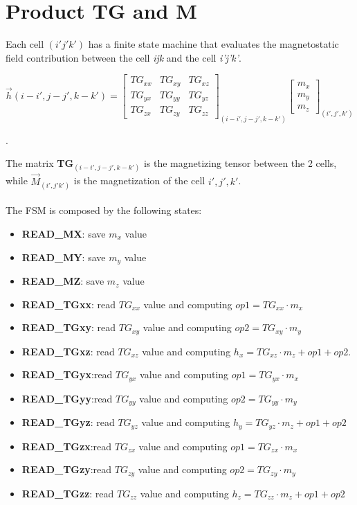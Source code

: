   \section{Product TG and M}
  Each cell $ (i'j'k') $ has a finite state machine that evaluates the magnetostatic field contribution between the cell \textit{ijk} and the cell \textit{i'j'k'}.
  \begin{center}
  		$ \overrightarrow{h}(i-i',j-j',k-k')= \begin{bmatrix}
  	TG_{xx} & TG_{xy} & TG_{xz}\\
  	TG_{yx} & TG_{yy}& TG_{yz}    	\\
  	TG_{zx}&TG_{zy} & TG_{zz}  
  	\end{bmatrix}_{(i-i',j-j',k-k')}\begin{bmatrix}
  	m_{x}\\
  	m_{y}\\
  	m_{z}\end{bmatrix}_{(i',j',k')}$
  \end{center}.
  
  The matrix \textbf{TG}$ _{(i-i',j-j',k-k')} $ is the magnetizing tensor between the 2 cells, while $ \overrightarrow{M}_{(i',j'k')} $ is the magnetization of the cell $ i',j',k'$.\\\\
  The FSM is composed by the following states:
  \begin{itemize}
  	 \item \textbf{READ\_MX}: save $ m_x $ value
  	 \item \textbf{READ\_MY}: save $ m_y $ value
  	 \item \textbf{READ\_MZ}: save $ m_z $ value
  	 \item \textbf{READ\_TGxx}: read $ TG_{xx} $ value and computing $ op1= TG_{xx}\cdot m_x$
  	 \item \textbf{READ\_TGxy}: read $ TG_{xy} $ value and computing $ op2= TG_{xy}\cdot m_y$
  	 \item \textbf{READ\_TGxz}: read $ TG_{xz} $ value and computing $ h_x= TG_{xz}\cdot m_z +op1+op2$.
  	 \item \textbf{READ\_TGyx}:read $ TG_{yx} $ value and computing $ op1= TG_{yx}\cdot m_x$
  	 \item \textbf{READ\_TGyy}:read $ TG_{yy} $ value and computing $ op2= TG_{yy}\cdot m_y$
  	 \item \textbf{READ\_TGyz}: read $ TG_{yz} $ value and computing $ h_y= TG_{yz}\cdot m_z +op1+op2$
  	 \item \textbf{READ\_TGzx}:read $ TG_{zx} $ value and computing $ op1= TG_{zx}\cdot m_x$
  	 \item \textbf{READ\_TGzy}:read $ TG_{zy} $ value and computing $ op2= TG_{zy}\cdot m_y$
  	 \item \textbf{READ\_TGzz}: read $ TG_{zz} $ value and computing $ h_z= TG_{zz}\cdot m_z +op1+op2$
  \end{itemize}
   
